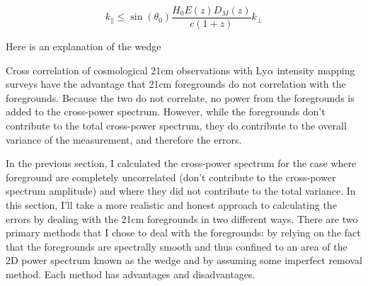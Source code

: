 \begin{equation}
    k_{\parallel} \leq \sin \left( \theta_0 \right) \frac{H_0 E \left( z \right) D_{M}\left( z \right)}{c \left(1 + z\right)} k_{\perp}
\end{equation}

Here is an explanation of the wedge

Cross correlation of cosmological 21cm observations with Ly$\alpha$ intensity
mapping surveys have the advantage that 21cm foregrounds do not correlation with
the foregrounds. Because the two do not correlate, no power from the foregrounds
is added to the cross-power spectrum. However, while the foregrounds don't contribute
to the total cross-power spectrum, they do contribute to the overall variance
of the measurement, and therefore the errors.

In the previous section, I calculated the cross-power spectrum for the case where
foreground are completely uncorrelated (don't contribute to the cross-power spectrum
amplitude) and where they did not contribute to the total variance. In this section,
I'll take a more realistic and honest approach to calculating the errors by dealing
with the 21cm foregrounds in two different ways. There are two primary methods
that I chose to deal with the foregrounds: by relying on the fact that the foregrounds
are spectrally smooth and thus confined to an area of the 2D power spectrum known
as the wedge and by assuming some imperfect removal method. Each method has advantages
and disadvantages.
